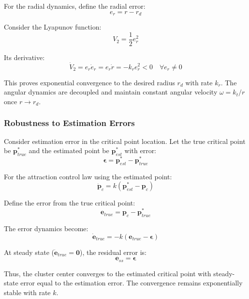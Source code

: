 \documentclass[lettersize,journal]{IEEEtran}
\begin{document}
For the radial dynamics, define the radial error:
\begin{equation}
e_r = r - r_d
\end{equation}

Consider the Lyapunov function:
\begin{equation}
V_2 = \frac{1}{2}e_r^2
\end{equation}

Its derivative:
\begin{equation}
\dot{V}_2 = e_r\dot{e}_r = e_r\dot{r} = -k_r e_r^2 < 0 \quad \forall e_r \neq 0
\end{equation}

This proves exponential convergence to the desired radius $r_d$ with rate $k_r$. The angular dynamics are decoupled and maintain constant angular velocity $\omega = k_t/r$ once $r \to r_d$.

\subsubsection{Robustness to Estimation Errors}

Consider estimation error in the critical point location. Let the true critical point be $\mathbf{p}^*_{true}$ and the estimated point be $\mathbf{p}^*_{est}$ with error:
\begin{equation}
\boldsymbol{\epsilon} = \mathbf{p}^*_{est} - \mathbf{p}^*_{true}
\end{equation}

For the attraction control law using the estimated point:
\begin{equation}
\dot{\mathbf{p}}_c = k(\mathbf{p}^*_{est} - \mathbf{p}_c)
\end{equation}

Define the error from the true critical point:
\begin{equation}
\mathbf{e}_{true} = \mathbf{p}_c - \mathbf{p}^*_{true}
\end{equation}

The error dynamics become:
\begin{equation}
\dot{\mathbf{e}}_{true} = -k(\mathbf{e}_{true} - \boldsymbol{\epsilon})
\end{equation}

At steady state ($\dot{\mathbf{e}}_{true} = \mathbf{0}$), the residual error is:
\begin{equation}
\mathbf{e}_{ss} = \boldsymbol{\epsilon}
\end{equation}

Thus, the cluster center converges to the estimated critical point with steady-state error equal to the estimation error. The convergence remains exponentially stable with rate $k$.
\end{document}
